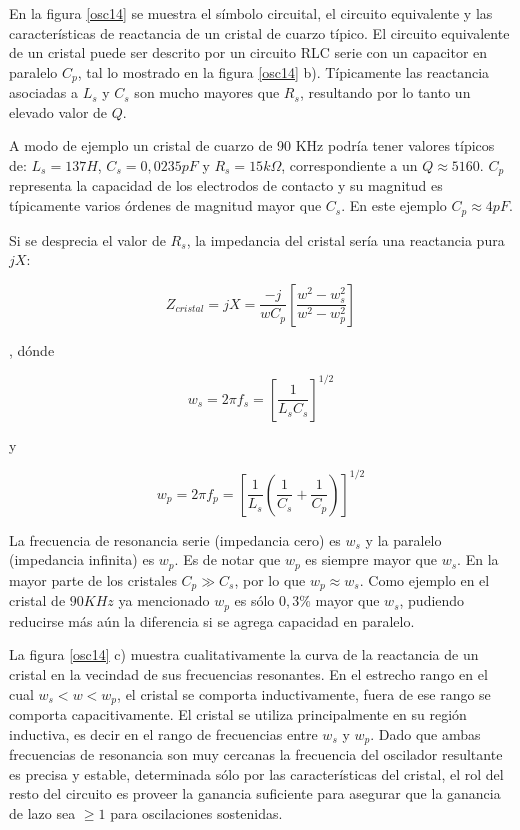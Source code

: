 En la figura \ref{osc14} se muestra el símbolo circuital, el
circuito equivalente y las características de reactancia de un
cristal de cuarzo típico. El circuito equivalente de un cristal
puede ser descrito por un circuito RLC serie con un capacitor en
paralelo $C_p$, tal lo mostrado en la figura \ref{osc14} b).
Típicamente las reactancia asociadas a $L_s$ y $C_s$ son mucho
mayores que $R_s$, resultando por lo tanto un elevado valor de $Q$.

A modo de ejemplo un cristal de cuarzo de 90 KHz podría tener
valores típicos de: $L_s=137 H$, $C_s=0,0235 pF$ y $R_s= 15
k\Omega$, correspondiente a un $Q\approx 5160$. $C_p$ representa la
capacidad de los electrodos de contacto y su magnitud es típicamente
varios órdenes de magnitud mayor que $C_s$. En este ejemplo
$C_p\approx 4 pF$.

Si se desprecia el valor de $R_s$, la impedancia del cristal sería
una reactancia pura $jX$:

\begin{equation}\label{ecu24}
	Z_{cristal} = jX = \frac{\displaystyle -j}{\displaystyle wC_p}\left[\frac{\displaystyle
		w^2-w_s^2}{\displaystyle w^2-w_p^2
	}\right]
\end{equation}

, dónde

\begin{equation}\label{ecu24}
	w_s = 2\pi f_s= \left[\frac{\displaystyle
		1}{\displaystyle L_sC_s
	}\right]^{1/2}
\end{equation}

y

\begin{equation}\label{ecu24}
	w_p = 2\pi f_p= \left[\frac{\displaystyle 1}{\displaystyle L_s}\left(\frac{\displaystyle
		1}{\displaystyle C_s}+\frac{\displaystyle
		1}{\displaystyle C_p}\right)\right]^{1/2}
\end{equation}

La frecuencia de resonancia serie (impedancia cero) es $w_s$ y la
paralelo (impedancia infinita) es $w_p$. Es de notar que $w_p$ es
siempre mayor que $w_s$. En la mayor parte de los cristales $C_p\gg
C_s$, por lo que $w_p\approx w_s$. Como ejemplo en el cristal de
$90KHz$ ya mencionado $w_p$ es sólo $0,3\%$ mayor que $w_s$,
pudiendo reducirse más aún la diferencia si se agrega capacidad en
paralelo.

La figura \ref{osc14} c) muestra cualitativamente la curva de la
reactancia de un cristal en la vecindad de sus frecuencias
resonantes. En el estrecho rango en el cual $w_s<w<w_p$, el cristal
se comporta inductivamente, fuera de ese rango se comporta
capacitivamente. El cristal se utiliza principalmente en su región
inductiva, es decir en el rango de frecuencias entre $w_s$ y $w_p$.
Dado que ambas frecuencias de resonancia son muy cercanas la
frecuencia del oscilador resultante es precisa y estable,
determinada sólo por las características del cristal, el rol del
resto del circuito es proveer la ganancia suficiente para asegurar
que la ganancia de lazo sea $\geq 1$ para oscilaciones sostenidas.

